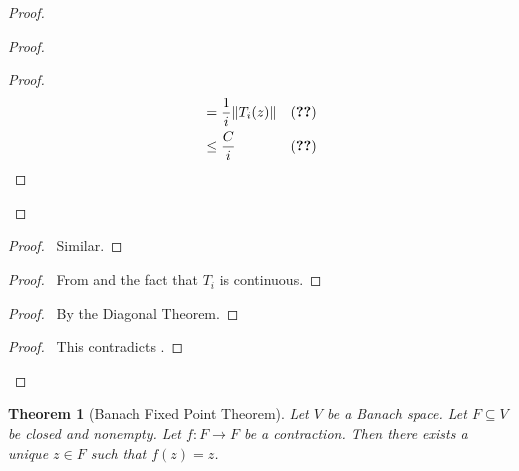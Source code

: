 \documentclass{book}
\let\qed\relax
\newtheorem{thm}[ax]{Theorem}
\theoremstyle{definition}
\begin{document}
\begin{proof}
\begin{proof}
\begin{proof}
\begin{align*}
			& = \frac{1}{i} \| T_i(z) \| & (\text{\stepref{10}}) \\
			& \leq \frac{C}{i} & (\text{\stepref{a}})
		\end{align*}
	\end{proof}
\end{proof}
\begin{proof}
	\pf\ Similar.
\end{proof}
\begin{proof}
	\pf\ From  and the fact that $T_i$ is continuous.
\end{proof}
\begin{proof}
	\pf\ By the Diagonal Theorem.
\end{proof}
\qedstep
\begin{proof}
	\pf\ This contradicts .
\end{proof}
\qed
\end{proof}

\begin{thm}[Banach Fixed Point Theorem]
Let $V$ be a Banach space. Let $F \subseteq V$ be closed and nonempty. Let $f : F \rightarrow F$ be a contraction. Then there exists a unique $z \in F$ such that $f(z) = z$.
\end{thm}
\end{document}
